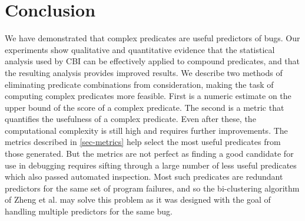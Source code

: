 
\section{Conclusion}
\label{sec-conc}
We have demonstrated that complex predicates are useful predictors of bugs.  
Our experiments show qualitative and quantitative evidence that the statistical 
analysis used by CBI can be effectively applied to compound predicates, and that
the resulting analysis provides improved results.  We describe
two methods of eliminating predicate combinations from consideration, making
the task of computing complex predicates more feasible.  First is a numeric 
estimate on the upper bound of the score of a complex predicate.  The second is 
a metric that quantifies the usefulness of a complex predicate.  Even after these, 
the computational complexity is still high and requires further improvements.  
The metrics described in \autoref{sec-metrics} help select the most useful predicates
from those generated.  But the metrics are not perfect as finding a good candidate
for use in debugging requires sifting through a large number of less useful predicates
which also passed automated inspection.  Most such predicates are redundant predictors
for the same set of program failures, and so the bi-clustering algorithm of Zheng et al. 
\cite{Zheng:2006:SDSIMB} may solve this problem as it was designed with the goal 
of handling multiple predictors for the same bug.
